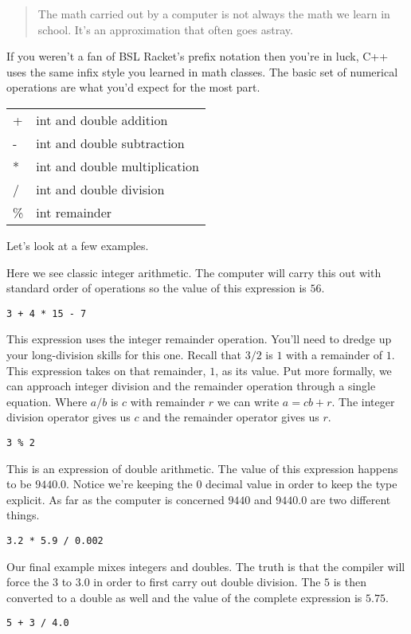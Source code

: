 \documentclass[]{tufte-handout}
\begin{document}
\begin{quote}
The math carried out by a computer is not always the math we learn in school. It's an approximation that often goes astray.
\end{quote}

If you weren't a fan of BSL Racket's prefix notation then you're in luck, C++ uses the same infix style you learned in math classes.  The basic set of numerical operations are what you'd expect for the most part.
\begin{center}
\begin{tabular}{ll}
+ & int and double addition \\
- & int and double subtraction \\
* & int and double multiplication \\
/ & int and double division \\
\% & int remainder
\end{tabular}
\end{center}

Let's look at a few examples.

Here we see classic integer arithmetic. The computer will carry this out with standard order of operations so the value of this expression is $56$.
\begin{verbatim}
3 + 4 * 15 - 7
\end{verbatim}

This expression uses the integer remainder operation. You'll need to dredge up your long-division skills for this one.  Recall that $3/2$ is $1$ with a remainder of $1$.  This expression takes on that remainder, $1$, as its value. Put more formally, we can approach integer division and the remainder operation through a single equation. Where $a/b$ is $c$ with remainder $r$ we can write $a = cb+r$. The integer division operator gives us $c$ and the remainder operator gives us $r$. 
\begin{verbatim}
3 % 2
\end{verbatim}

This is an expression of double arithmetic. The value of this expression happens to be $9440.0$.  Notice we're keeping the $0$ decimal value in order to keep the type explicit. As far as the computer is concerned $9440$ and $9440.0$ are two different things. 
\begin{verbatim}
3.2 * 5.9 / 0.002
\end{verbatim}

Our final example mixes integers and doubles.  The truth is that the compiler will force the $3$ to $3.0$ in order to first carry out double division. The $5$ is then converted to a double as well and the value of the complete expression is $5.75$.  
\begin{verbatim}
5 + 3 / 4.0 
\end{verbatim}
\end{document}
